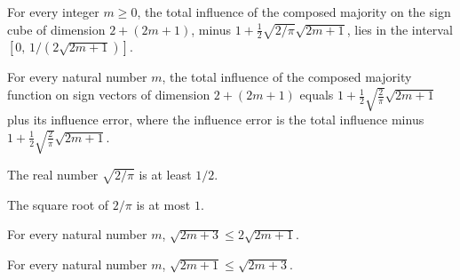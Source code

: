 \begin{theorem}
\label{FABL.composedMajorityInfluenceError_mem_Icc}
\leanok
{}
For every integer $m\ge 0$, the total influence of the composed majority on the sign
cube of dimension $2+(2m+1)$, minus $1+\frac12\sqrt{2/\pi}\sqrt{2m+1}$, lies in the
interval $[0,\,1/(2\sqrt{2m+1})]$.
\end{theorem}

\begin{theorem}
\label{FABL.totalInfluence_composedMajority_eq_main_add_error}
\leanok
{}
For every natural number $m$, the total influence of the composed majority function on
sign vectors of dimension $2+(2m+1)$ equals
$1+\frac{1}{2}\sqrt{\frac{2}{\pi}}\sqrt{2m+1}$ plus its influence error, where the
influence error is the total influence minus
$1+\frac{1}{2}\sqrt{\frac{2}{\pi}}\sqrt{2m+1}$.
\end{theorem}

\begin{theorem}
\label{FABL.one_half_le_sqrt_two_div_pi}
\leanok
{}
The real number $\sqrt{2/\pi}$ is at least $1/2$.
\end{theorem}

\begin{theorem}
\label{FABL.sqrt_two_div_pi_le_one}
\leanok
{}
The square root of $2/\pi$ is at most $1$.
\end{theorem}

\begin{theorem}
\label{FABL.sqrt_composedMajority_dimension_le}
\leanok
{}
For every natural number $m$, $\sqrt{2m+3}\le 2\sqrt{2m+1}$.
\end{theorem}

\begin{theorem}
\label{FABL.sqrt_majorityTail_le_composedMajority_dimension}
\leanok
{}
For every natural number $m$, $\sqrt{2m+1}\le \sqrt{2m+3}$.
\end{theorem}

